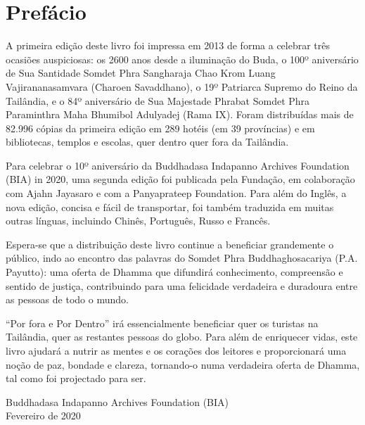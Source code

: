 \clearpage
\chapter{Prefácio}

{\fontsize{10.5}{13.5}\selectfont

A primeira edição deste livro foi impressa em 2013 de forma a celebrar três
ocasiões auspiciosas: os 2600 anos desde a iluminação do Buda, o 100º
aniversário de Sua Santidade Somdet Phra Sangharaja Chao Krom Luang
Vajirananasamvara (Charoen Savaddhano), o 19º Patriarca Supremo do Reino da
Tailândia, e o 84º aniversário de Sua Majestade Phrabat Somdet Phra Paraminthra
Maha Bhumibol Adulyadej (Rama IX). Foram distribuídas mais de 82.996 cópias da
primeira edição em 289 hotéis (em 39 províncias) e em bibliotecas, templos e
escolas, quer dentro quer fora da Tailândia.

Para celebrar o 10º aniversário da Buddhadasa Indapanno Archives Foundation
(BIA) in 2020, uma segunda edição foi publicada pela Fundação, em colaboração
com Ajahn Jayasaro e com a Panyaprateep Foundation. Para além do Inglês, a nova
edição, concisa e fácil de transportar, foi também traduzida em muitas outras
línguas, incluindo Chinês, Português, Russo e Francês.

Espera-se que a distribuição deste livro continue a beneficiar grandemente o
público, indo ao encontro das palavras do Somdet Phra Buddhaghosacariya (P.A.
Payutto): uma oferta de Dhamma que difundirá conhecimento, compreensão e sentido
de justiça, contribuindo para uma felicidade verdadeira e duradoura entre as
pessoas de todo o mundo.

``Por fora e Por Dentro'' irá essencialmente beneficiar quer os turistas na
Tailândia, quer as restantes pessoas do globo. Para além de enriquecer vidas,
este livro ajudará a nutrir as mentes e os corações dos leitores e proporcionará
uma noção de paz, bondade e clareza, tornando-o numa verdadeira oferta de
Dhamma, tal como foi projectado para ser.

\bigskip

{\raggedleft
  Buddhadasa Indapanno Archives Foundation (BIA)\\
  Fevereiro de 2020
\par}

}

